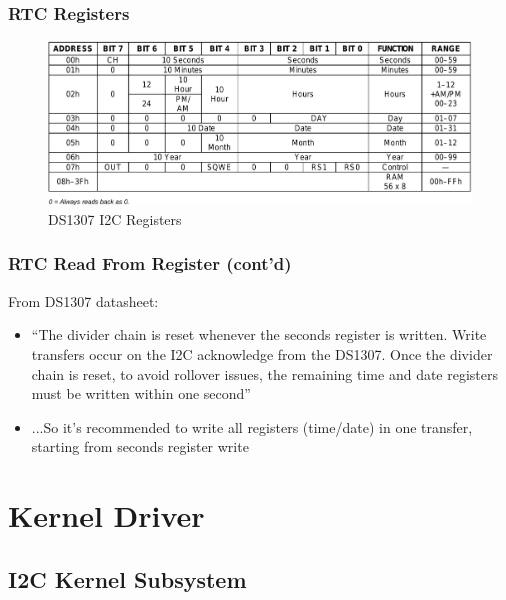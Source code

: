 \documentclass[aspectratio=169,usenames,dvipsnames]{beamer}
\newcounter{cont}
\begin{document}
\begin{frame}
  \frametitle{RTC Registers}
  \begin{figure}
    \centering
    \includegraphics[scale=0.3]{images/rtc-registers.png}
    \caption{DS1307 I2C Registers}
  \end{figure}
\end{frame}

\begin{frame}
  \frametitle{RTC Read From Register (cont'd)}
  From DS1307 datasheet:
  \begin{itemize}
    \item ``The divider chain is reset whenever the seconds register is written. Write transfers
occur on the I2C acknowledge from the DS1307. Once the divider chain is reset,
to avoid rollover issues, the remaining time and date registers must be written within one second''
    \item ...So it's recommended to write all registers (time/date) in one transfer, starting from seconds register write
  \end{itemize}
\end{frame}


\section{Kernel Driver}

\subsection{I2C Kernel Subsystem}
\end{document}
